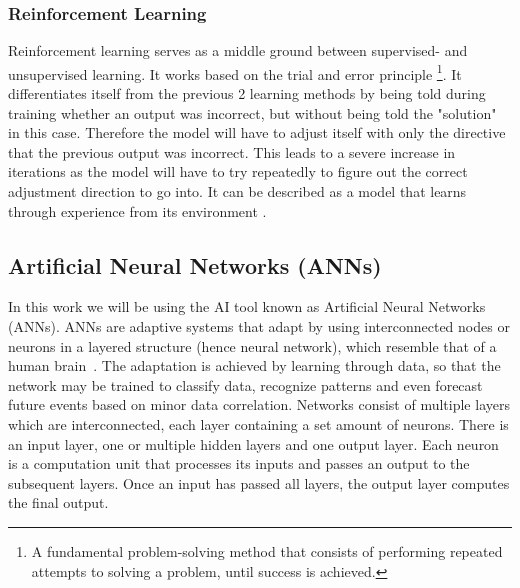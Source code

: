 \subsubsection{Reinforcement Learning}
Reinforcement learning serves as a middle ground between supervised- and unsupervised learning. It works based on the trial and error principle \footnote{A fundamental problem-solving method that consists of performing repeated attempts to solving a problem, until success is achieved.}. It differentiates itself from the previous 2 learning methods by being told during training whether an output was incorrect, but without being told the "solution" in this case. Therefore the model will have to adjust itself with only the directive that the previous output was incorrect. This leads to a severe increase in iterations as the model will have to try repeatedly to figure out the correct adjustment direction to go into. It can be described as a model that learns through experience from its environment \cite{matlab:reinforce}.

\subsection{Artificial Neural Networks (ANNs)}

In this work we will be using the AI tool known as Artificial Neural Networks (ANNs). ANNs are adaptive systems that adapt by using interconnected nodes or neurons in a layered structure (hence neural network), which resemble that of a human brain~\cite{mathworks:ANNs}. The adaptation is achieved by learning through data, so that the network may be trained to classify data, recognize patterns and even forecast future events based on minor data correlation. Networks consist of multiple layers which are interconnected, each layer containing a set amount of neurons. There is an input layer, one or multiple hidden layers and one output layer. Each neuron is a computation unit that processes its inputs and passes an output to the subsequent layers. Once an input has passed all layers, the output layer computes the final output.

